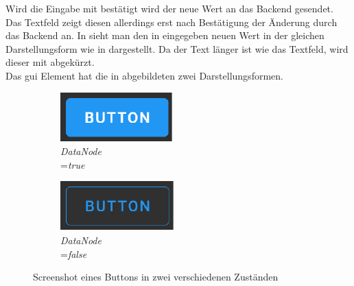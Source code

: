 Wird die Eingabe mit  bestätigt wird der neue Wert an das Backend gesendet. 
Das Textfeld zeigt diesen allerdings erst nach Bestätigung der Änderung durch das Backend an. 
In  sieht man den in  eingegeben neuen Wert  in der gleichen Darstellungsform wie in  dargestellt.
Da der Text länger ist wie das Textfeld, wird dieser mit \eigenNameNorm{ \dots} abgekürzt.
\\Das \ac{gui} Element  hat die in  abgebildeten zwei Darstellungsformen.
\begin{figure}[ht]
  \centering
  \hspace{0.1\textwidth}
  \begin{subfigure}[h]{0.25\textwidth}
    \centering
    \includegraphics[width=\textwidth]{content/hauptteil/umsetzungPoC/frontend/res/buttonTrue.pdf}
    \caption{\emph{DataNode} \\=\emph{true}}
    \label{fig:frontend:poc:button:true}
  \end{subfigure}
  \hfill
  \begin{subfigure}[h]{0.25\textwidth}
    \centering
    \includegraphics[width=\textwidth]{content/hauptteil/umsetzungPoC/frontend/res/buttonFalse.pdf}
    \caption{\emph{DataNode} \\=\emph{false}}
    \label{fig:frontend:poc:button:false}
  \end{subfigure}
  \hspace{0.1\textwidth}
  \caption[Screenshot, Zustände eines Buttons]{Screenshot eines Buttons in zwei verschiedenen Zuständen}
  \label{fig:frontend:poc:button}
\end{figure}
